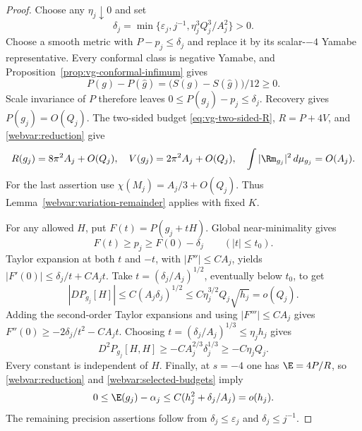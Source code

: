 \begin{proof}
Choose any $\eta_j\downarrow0$ and set
\begin{equation}\label{webvar:selection-precision}
 \delta_j=\min\{\varepsilon_j,j^{-1},\eta_j^3Q_j^3/A_j^2\}>0.
\end{equation}
Choose a smooth metric with $P-p_j\le\delta_j$ and replace it by
its scalar-$-4$ Yamabe representative.  Every conformal class is
negative Yamabe, and Proposition~\ref{prop:vg-conformal-infimum} gives
\[
 P(g)-P(\widehat g)
       =\bigl(S(g)-S(\widehat g)\bigr)/12\ge0.
\]
Scale invariance of $P$ therefore leaves
$0\le P(g_j)-p_j\le\delta_j$.  Recovery gives $P(g_j)=O(Q_j)$.
The two-sided budget \eqref{eq:vg-two-sided-R}, $R=P+4V$, and
\eqref{webvar:reduction} give
\begin{equation}\label{webvar:selected-budgets}
 R(g_j)=8\pi^2A_j+O(Q_j),\quad
 V(g_j)=2\pi^2A_j+O(Q_j),\quad
 \int|\Rm_{g_j}|^2\,d\mu_{g_j}=O(A_j).
\end{equation}
For the last assertion use $\chi(M_j)=A_j/3+O(Q_j)$.
Thus Lemma~\ref{webvar:variation-remainder} applies with fixed $K$.

For any allowed $H$, put $F(t)=P(g_j+tH)$.  Global near-minimality gives
\begin{equation}\label{webvar:finite-minimality}
 F(t)\ge p_j\ge F(0)-\delta_j\qquad(|t|\le t_0).
\end{equation}
Taylor expansion at both $t$ and $-t$, with $|F''|\le C A_j$, yields
$|F'(0)|\le\delta_j/t+C A_jt$.  Take
$t=(\delta_j/A_j)^{1/2}$, eventually below $t_0$, to get
\begin{equation}\label{webvar:first-variation-bound}
 |DP_{g_j}[H]|\le C(A_j\delta_j)^{1/2}
       \le C\eta_j^{3/2}Q_j\sqrt{h_j}=o(Q_j).
\end{equation}
Adding the second-order Taylor expansions and using $|F'''|\le C A_j$
gives $F''(0)\ge-2\delta_j/t^2-C A_jt$.  Choosing
$t=(\delta_j/A_j)^{1/3}\le\eta_jh_j$ gives
\begin{equation}\label{webvar:second-variation-bound}
 D^2P_{g_j}[H,H]\ge-C A_j^{2/3}\delta_j^{1/3}\ge-C\eta_jQ_j.
\end{equation}
Every constant is independent of $H$.  Finally, at $s=-4$ one has
$\E=4P/R$, so \eqref{webvar:reduction} and
\eqref{webvar:selected-budgets} imply
\[
 0\le\E(g_j)-\alpha_j\le C(h_j^2+\delta_j/A_j)=o(h_j).
\]
The remaining precision assertions follow from
$\delta_j\le\varepsilon_j$ and $\delta_j\le j^{-1}$.
\end{proof}

